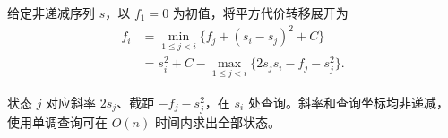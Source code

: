 给定非递减序列 $s$，以 $f_1=0$ 为初值，将平方代价转移展开为
\[
\begin{aligned}
f_i&=\min_{1\le j<i}\{f_j+(s_i-s_j)^2+C\}\\
&=s_i^2+C-\max_{1\le j<i}\{2s_js_i-f_j-s_j^2\}.
\end{aligned}
\]

状态 $j$ 对应斜率 $2s_j$、截距 $-f_j-s_j^2$，在 $s_i$ 处查询。斜率和查询坐标均非递减，使用单调查询可在 $O(n)$ 时间内求出全部状态。
